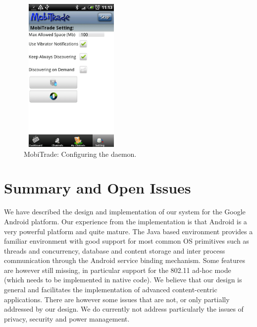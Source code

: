 \begin{figure}[!h]
\begin{center}
\includegraphics[width=2in,height=3in]{Chapitre6/Config.png}
\end{center}
\caption{MobiTrade: Configuring the daemon.}
\label{Config}
\end{figure}

\section{Summary and Open Issues}
\label{MobiTradeSoftSummary}

We have described the design and implementation of our system for the Google Android platform. Our experience from the implementation is that Android is a very powerful platform and quite mature. The Java based environment provides a familiar environment with good support for most common OS primitives such as threads and concurrency, database and content storage and inter process communication through the Android service binding mechanism. Some features are however still missing, in particular support for the 802.11 ad-hoc mode (which needs to be implemented in native code). We believe that our design is general and facilitates the implementation of 
advanced content-centric applications. There are however some issues that are not, or only partially addressed by our design. We do currently not address particularly the issues of privacy, security and power management.
